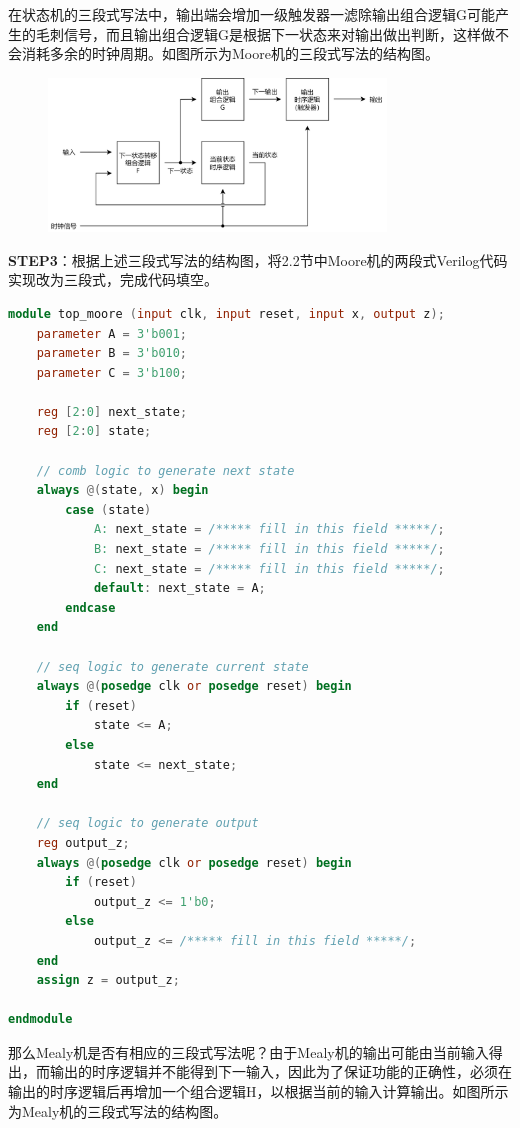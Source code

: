 \documentclass{ctexart}
\begin{document}
在状态机的三段式写法中，输出端会增加一级触发器一滤除输出组合逻辑G可能产生的毛刺信号，而且输出组合逻辑G是根据下一状态来对输出做出判断，这样做不会消耗多余的时钟周期。如图所示为Moore机的三段式写法的结构图。

\begin{figure}[H]
    \centering
    \includegraphics[width=0.8\textwidth]{lab2/7.png}
\end{figure}

\textbf{STEP3}：根据上述三段式写法的结构图，将2.2节中Moore机的两段式Verilog代码实现改为三段式，完成代码填空。
\begin{lstlisting}[language=Verilog]
module top_moore (input clk, input reset, input x, output z); 
    parameter A = 3'b001;
    parameter B = 3'b010;
    parameter C = 3'b100;

    reg [2:0] next_state;
    reg [2:0] state;

    // comb logic to generate next state
    always @(state, x) begin
        case (state)
            A: next_state = /***** fill in this field *****/;
            B: next_state = /***** fill in this field *****/;
            C: next_state = /***** fill in this field *****/;
            default: next_state = A;
        endcase
    end

    // seq logic to generate current state
    always @(posedge clk or posedge reset) begin
        if (reset)
            state <= A;
        else
            state <= next_state;
    end

    // seq logic to generate output
    reg output_z;
    always @(posedge clk or posedge reset) begin
        if (reset)
            output_z <= 1'b0;
        else
            output_z <= /***** fill in this field *****/;
    end
    assign z = output_z;

endmodule
\end{lstlisting}

那么Mealy机是否有相应的三段式写法呢？由于Mealy机的输出可能由当前输入得出，而输出的时序逻辑并不能得到下一输入，因此为了保证功能的正确性，必须在输出的时序逻辑后再增加一个组合逻辑H，以根据当前的输入计算输出。如图所示为Mealy机的三段式写法的结构图。
\end{document}
